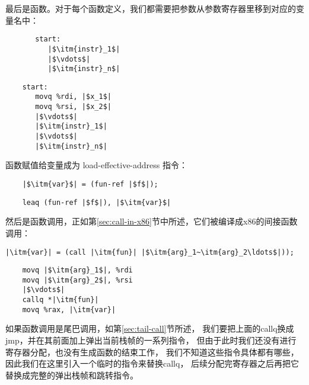 最后是函数。对于每个函数定义，我们都需要把参数从参数寄存器里移到对应的变量名中：
\begin{transformation}
\begin{lstlisting}
       start:
          |$\itm{instr}_1$|
          |$\vdots$|
          |$\itm{instr}_n$|
\end{lstlisting}
\compilesto
\begin{lstlisting}
    start:
       movq %rdi, |$x_1$|
       movq %rsi, |$x_2$|
       |$\vdots$|
       |$\itm{instr}_1$|
       |$\vdots$|
       |$\itm{instr}_n$|
\end{lstlisting}
\end{transformation}

函数赋值给变量成为 load-effective-address 指令：
\begin{transformation}
\begin{lstlisting}
    |$\itm{var}$| = (fun-ref |$f$|);
\end{lstlisting}
\compilesto
\begin{lstlisting}
    leaq (fun-ref |$f$|), |$\itm{var}$|
\end{lstlisting}
\end{transformation}

然后是函数调用，正如第\ref{sec:call-in-x86}节中所述，它们被编译成x86的间接函数调用：
\begin{transformation}
\begin{lstlisting}
|\itm{var}| = (call |\itm{fun}| |$\itm{arg}_1~\itm{arg}_2\ldots$|));
\end{lstlisting}
\compilesto
\begin{lstlisting}
    movq |$\itm{arg}_1$|, %rdi
    movq |$\itm{arg}_2$|, %rsi
    |$\vdots$|
    callq *|\itm{fun}|
    movq %rax, |\itm{var}|
\end{lstlisting}
\end{transformation}

如果函数调用是尾巴调用，如第\ref{sec:tail-call}节所述，
我们要把上面的callq换成jmp，并在其前面加上弹出当前栈帧的一系列指令，
但由于此时我们还没有进行寄存器分配，也没有生成函数的结束工作，
我们不知道这些指令具体都有哪些，因此我们在这里引入一个临时的指令来替换callq，
后续分配完寄存器之后再把它替换成完整的弹出栈帧和跳转指令。

